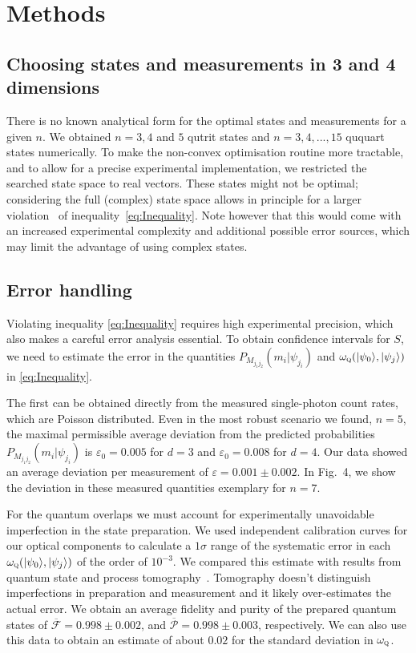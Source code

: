 \documentclass[aps,prl,floatfix,onecolumn,tightenlines,amsmath,amssymb,nofootinbib,12pt]{revtex4-2}
\newcommand{\ket}[1] {| #1 \rangle}
\newcommand{\ve} {\varepsilon}
\begin{document}
\section{Methods}

\subsection{Choosing states and measurements in 3 and 4 dimensions}
There is no known analytical form for the optimal states and measurements for a given $n$. We obtained $n=3, 4$ and $5$ qutrit states and $n=3,4,...,15$ ququart states numerically. To make the non-convex optimisation routine more tractable, and to allow for a precise experimental implementation, we restricted the searched state space to real vectors. These states might not be optimal; considering the full (complex) state space allows in principle for a larger violation~\cite{Barrett2014,Branciard2014a} of inequality~\eqref{eq:Inequality}.
Note however that this would come with an increased experimental complexity and additional possible error sources, which may limit the advantage of using complex states.


\subsection{Error handling}
Violating inequality \eqref{eq:Inequality} requires high experimental precision, which also makes a careful error analysis essential. To obtain confidence intervals for $S$, we need to estimate the error in the quantities $P_{M_{j_1j_2}}(m_i | \psi_{j_i})$ and $\omega_{\textsc{q}}(\ket{\psi_0},\ket{\psi_j})$ in \eqref{eq:Inequality}. 

The first can be obtained directly from the measured single-photon count rates, which are Poisson distributed. Even in the most robust scenario we found, $n=5$, the maximal permissible average deviation from the predicted probabilities~\cite{Branciard2014a}  $P_{M_{j_1j_2}}(m_i | \psi_{j_i})$ is $\ve_0=0.005$ for $d=3$ and $\ve_0=0.008$ for $d=4$. Our data showed an average deviation per measurement of $\ve=0.001 \pm 0.002$. In Fig.~4, we show the deviation in these measured quantities exemplary for $n=7$.

For the quantum overlaps we must account for experimentally unavoidable imperfection in the state preparation. We used independent calibration curves for our optical components to calculate a $1\sigma$ range of the systematic error in each $\omega_{\textsc{q}}(\ket{\psi_0},\ket{\psi_j})$ of the order of $10^{-3}$. We compared this estimate with results from quantum state and process tomography~\cite{james2001mq}. Tomography doesn't distinguish imperfections in preparation and measurement and it likely over-estimates the actual error. We obtain an average fidelity and purity of the prepared quantum states of $\overline{\mathcal{F}}=0.998 \pm 0.002$, and $\overline{\mathcal{P}}=0.998 \pm 0.003$, respectively. We can also use this data to obtain an estimate of about $0.02$ for the standard deviation in $\omega_{\textsc{q}}$.
\end{document}
